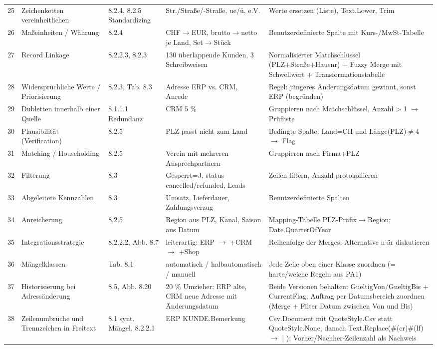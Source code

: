 \begin{landscape}
\begin{small}
\begin{longtable}{@{}r p{3.4cm} p{2.6cm} p{5.2cm} p{7.4cm}@{}}
25 & Zeichenketten vereinheitlichen & 8.2.4, 8.2.5 Standardizing & Str./Straße/-Straße, ue/ü, e.V. & Werte ersetzen (Liste), Text.Lower, Trim\\[2pt]
26 & Maßeinheiten / Währung & 8.2.4 & CHF$\rightarrow$EUR, brutto$\rightarrow$netto je Land, Set$\rightarrow$Stück & Benutzerdefinierte Spalte mit Kurs-/MwSt-Tabelle\\[2pt]
27 & Record Linkage & 8.2.2.3, 8.2.3 & 130 überlappende Kunden, 3 Schreibweisen & Normalisierter Matchschlüssel (PLZ+Straße+Hausnr) + Fuzzy Merge mit Schwellwert + Transformationstabelle\\[2pt]
28 & Widersprüchliche Werte / Priorisierung & 8.2.3, Tab. 8.3 & Adresse ERP vs. CRM, Anrede & Regel: jüngeres Änderungsdatum gewinnt, sonst ERP (begründen)\\[2pt]
29 & Dubletten innerhalb einer Quelle & 8.1.1.1 Redundanz & CRM 5 \% & Gruppieren nach Matchschlüssel, Anzahl \textgreater{} 1 $\rightarrow$ Prüfliste\\[2pt]
30 & Plausibilität (Verification) & 8.2.5 & PLZ passt nicht zum Land & Bedingte Spalte: Land=CH und Länge(PLZ)$\neq$4 $\rightarrow$ Flag\\[2pt]
31 & Matching / Householding & 8.2.5 & Verein mit mehreren Ansprechpartnern & Gruppieren nach Firma+PLZ\\[2pt]
32 & Filterung & 8.3 & Gesperrt=J, status cancelled/refunded, Leads & Zeilen filtern, Anzahl protokollieren\\[2pt]
33 & Abgeleitete Kennzahlen & 8.3 & Umsatz, Lieferdauer, Zahlungsverzug & Benutzerdefinierte Spalten\\[2pt]
34 & Anreicherung & 8.2.5 & Region aus PLZ, Kanal, Saison aus Datum & Mapping-Tabelle PLZ-Präfix$\rightarrow$Region; Date.QuarterOfYear\\[2pt]
35 & Integrationsstrategie & 8.2.2.2, Abb. 8.7 & leiterartig: ERP $\rightarrow$ +CRM $\rightarrow$ +Shop & Reihenfolge der Merges; Alternative n-är diskutieren\\[2pt]
36 & Mängelklassen & Tab. 8.1 & automatisch / halbautomatisch / manuell & Jede Zeile oben einer Klasse zuordnen (= harte/weiche Regeln aus PA1)\\[2pt]
37 & Historisierung bei Adressänderung & 8.5, Abb. 8.20 & 20 \% Umzieher: ERP alte, CRM neue Adresse mit Änderungsdatum & Beide Versionen behalten: GueltigVon/GueltigBis + CurrentFlag; Auftrag per Datumsbereich zuordnen (Merge + Filter Datum zwischen Von und Bis)\\[2pt]
38 & Zeilenumbrüche und Trennzeichen in Freitext & 8.1 synt. Mängel, 8.2.2.1 & ERP KUNDE.Bemerkung & Csv.Document mit QuoteStyle.Csv statt QuoteStyle.None; danach Text.Replace(\#(cr)\#(lf) $\rightarrow$ \grqq{} | \grqq{}); Vorher/Nachher-Zeilenzahl als Nachweis\\[2pt]

\end{longtable}
\end{small}
\end{landscape}
